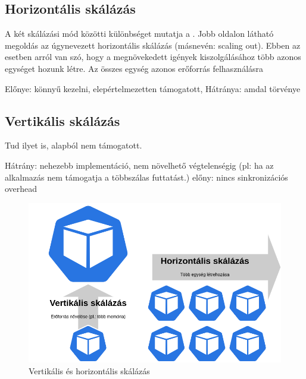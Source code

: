 \subsection{Horizontális skálázás}
A két skálázási mód közötti különbséget mutatja a . Jobb oldalon látható megoldás az úgynevezett horizontális skálázás (másnevén: scaling out). Ebben az esetben arról van szó, hogy a megnövekedett igények kiszolgálásához több azonos egységet hozunk létre. Az összes egység azonos erőforrás felhasználásra

Előnye: könnyű kezelni, elepértelmezetten támogatott, 
Hátránya: amdal törvénye


\subsection{Vertikális skálázás}
Tud ilyet is, alapból nem támogatott.

Hátrány: nehezebb implementáció, nem növelhető végtelenségig (pl: ha az alkalmazás nem támogatja a többszálas futtatást.)
előny: nincs sinkronizációs overhead


\begin{figure}[!ht]
\centering
\includegraphics[width=150mm, keepaspectratio]{figures/scaling_types.png}
\caption{Vertikális és horizontális skálázás}
\label{fig:scaling}
\end{figure}
